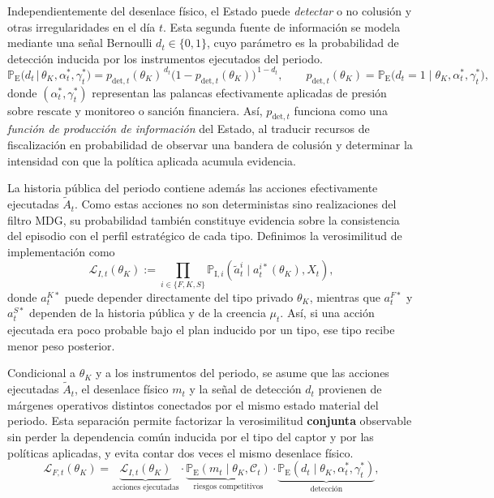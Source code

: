 \documentclass[12pt]{article}
\theoremstyle{definition}
\theoremstyle{remark}
\newcommand{\ProbE}{\mathbb{P}_{\mathrm{E}}}
\newcommand{\ProbI}[1]{\mathbb{P}_{\mathrm{I},#1}}
\newcommand{\1}{\mathbf{1}}
\begin{document}
Independientemente del desenlace físico, el Estado puede \emph{detectar} o no colusión y otras irregularidades en el día $t$. Esta segunda fuente de información se modela mediante una señal Bernoulli $d_t\in\{0,1\}$, cuyo parámetro es la probabilidad de detección inducida por los instrumentos ejecutados del periodo.
\begin{equation}
\label{eq:Ld-bernoulli}
\ProbE\bigl(d_t \,\big|\, \theta_K,\alpha_t^\ast,\gamma_t^\ast\bigr)=p_{\mathrm{det},t}(\theta_K)^{\,d_t}\bigl(1-p_{\mathrm{det},t}(\theta_K)\bigr)^{\,1-d_t}, \qquad p_{\mathrm{det},t}(\theta_K)=\ProbE\bigl(d_t=1\mid \theta_K,\alpha_t^\ast,\gamma_t^\ast\bigr),
\end{equation}
donde $(\alpha_t^\ast,\gamma_t^\ast)$ representan las palancas efectivamente aplicadas de presión sobre rescate y monitoreo o sanción financiera. Así, $p_{\mathrm{det},t}$ funciona como una \emph{función de producción de información} del Estado, al traducir recursos de fiscalización en probabilidad de observar una bandera de colusión y determinar la intensidad con que la política aplicada acumula evidencia.

La historia pública del periodo contiene además las acciones efectivamente ejecutadas $\tilde{A}_t$. Como estas acciones no son deterministas sino realizaciones del filtro MDG, su probabilidad también constituye evidencia sobre la consistencia del episodio con el perfil estratégico de cada tipo. Definimos la verosimilitud de implementación como
\begin{equation}
\label{eq:LI-atilde}
\mathcal{L}_{I,t}(\theta_K)
:=
\prod_{i\in\{F,K,S\}}
\ProbI{i}\!\left(\tilde{a}_t^i \mid a_t^{i\ast}(\theta_K),X_t\right),
\end{equation}
donde $a_t^{K\ast}$ puede depender directamente del tipo privado $\theta_K$, mientras que $a_t^{F\ast}$ y $a_t^{S\ast}$ dependen de la historia pública y de la creencia $\mu_t$. Así, si una acción ejecutada era poco probable bajo el plan inducido por un tipo, ese tipo recibe menor peso posterior.

Condicional a $\theta_K$ y a los instrumentos del periodo, se asume que las acciones ejecutadas $\tilde A_t$, el desenlace físico $m_t$ y la señal de detección $d_t$ provienen de márgenes operativos distintos conectados por el mismo estado material del periodo. Esta separación permite factorizar la verosimilitud \textbf{conjunta} observable sin perder la dependencia común inducida por el tipo del captor y por las políticas aplicadas, y evita contar dos veces el mismo desenlace físico.
\begin{equation}
\label{eq:LH-joint}
\mathcal{L}_{F,t}(\theta_K)
=
\underbrace{\mathcal{L}_{I,t}(\theta_K)}_{\text{acciones ejecutadas}}
\cdot
\underbrace{\ProbE(m_t \mid \theta_K,\mathcal C_t)}_{\text{riesgos competitivos}}
\cdot
\underbrace{\ProbE(d_t \mid \theta_K,\alpha_t^\ast,\gamma_t^\ast)}_{\text{detección}},
\end{equation}
\end{document}
